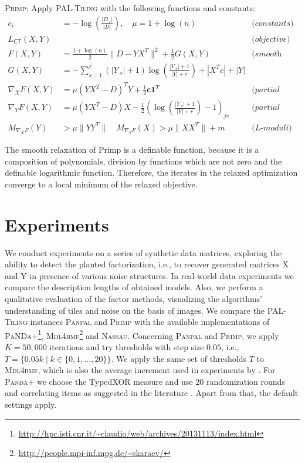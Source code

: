 \begin{mybox}
\textsc{Primp}: Apply \textsc{PAL-Tiling} with the following functions and constants:
\begin{align*}
    c_i&=-\log\left(\frac{|D_{\cdot i}|}{|D|}\right),\quad \mu= 1+\log(n) &\textit{(constants)}\\
    L_{\mathsf{CT}}(X,Y) & & \textit{(objective)}\\
    F(X,Y)&=\frac{1+\log(n)}{2}\|D-YX^T\|^2+ \frac{1}{2}G(X,Y) & \textit{(smooth part)}\\
    G(X,Y)&=-\sum_{s=1}^r(|Y_{\cdot s}|+1)\log\left(\frac{|Y_{\cdot s}|+1}{|Y|+r}\right) +|X^Tc| +|Y|&\\
    \nabla_XF(X,Y)&=\mu(YX^T-D)^TY+\frac{1}{2}\mathbf{c}\mathbf{1}^T & \textit{(partial gradient X)}\\
    \nabla_YF(X,Y)&=\mu(YX^T-D)X-\frac{1}{2}\left(\log\left(\frac{|Y_{\cdot s}|+1}{|Y|+r}\right)-1\right)_{js}& \textit{(partial gradient Y)}\\
    M_{\nabla_X F}(Y)&>\mu\|YY^T\|\quad M_{\nabla_Y F}(X)>\mu\|XX^T\|+m & \textit{(L-moduli)}
\end{align*}
\end{mybox}
The smooth relaxation of Primp is a definable function, because it is a composition of polynomials, division by functions which are not zero and the definable logarithmic function. Therefore, the iterates in the relaxed optimization converge to a local minimum of the relaxed objective.
\section{Experiments}\label{sec:MDL:Experiments}
We conduct experiments on a series of synthetic data matrices, exploring the ability to detect the planted factorization, i.e., to recover generated matrices X and Y in presence of various noise structures. In real-world data experiments we compare the description lengths of obtained models. Also, we perform a qualitative evaluation of the factor methods, visualizing the algorithms' understanding of tiles and noise on the basis of images. We compare the \textsc{PAL-Tiling} instances \textsc{Panpal} and \textsc{Primp} with the available implementations of 
\textsc{PaNDa+}\footnote{\url{http://hpc.isti.cnr.it/~claudio/web/archives/20131113/index.html}}, \textsc{Mdl4bmf}\footnote{\label{note1}\url{http://people.mpi-inf.mpg.de/~skaraev/}} and \textsc{Nassau}. Concerning \textsc{Panpal} and \textsc{Primp}, we apply $K=50,000$ iterations and try thresholds with step size $0.05$, i.e., $T=\{0.05k\mid k\in\{0,1,\ldots,20\}\}$. We apply the same set of thresholds $T$ to \textsc{Mdl4bmf}, which is also the average increment used in experiments by \cite{miettinen2014mdl4bmf,lucchese2014unifying,karaev2015getting}. For \textsc{Panda+} we choose the TypedXOR measure and use 20 randomization rounds and correlating items as suggested in the literature \citep{lucchese2014unifying}. Apart from that, the default settings apply. 

